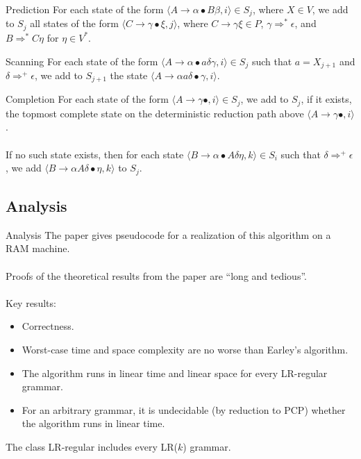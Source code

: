 \documentclass{beamer}
\begin{document}
\begin{frame}{Prediction}
  For each state of the form $\langle A \to \alpha \bullet B \beta, i\rangle \in S_j$, where $X \in V$, we add to $S_j$ all states of the form
  $\langle C \to \gamma\bullet\xi, j\rangle$, where $C \to \gamma\xi \in P$, $\gamma \Rightarrow^* \epsilon$, and $B \Rightarrow^* C\eta$ for $\eta\in V^*$.
\end{frame}

\begin{frame}{Scanning}
  For each state of the form $\langle A \to \alpha \bullet a \delta\gamma, i\rangle\in S_j$ such that $a = X_{j+1}$ and $\delta \Rightarrow^+ \epsilon$, we add to $S_{j+1}$
  the state $\langle A \to \alpha a\delta\bullet\gamma, i\rangle$.
\end{frame}

\begin{frame}{Completion}
  For each state of the form $\langle A \to \gamma\bullet, i\rangle\in S_j$, we add to $S_j$, if it exists, the topmost complete state on the deterministic reduction path above
  $\langle A \to \gamma\bullet, i\rangle$.\\~\\

  If no such state exists, then for each state $\langle B \to \alpha \bullet A \delta\eta, k\rangle\in S_i$ such that $\delta \Rightarrow^+ \epsilon$, we add
  $\langle B \to \alpha A \delta\bullet\eta, k\rangle$ to $S_j$.
\end{frame}

\subsection{Analysis}
\begin{frame}{Analysis}
  The paper gives pseudocode for a realization of this algorithm on a RAM machine.\\~\\

  Proofs of the theoretical results from the paper are ``long and tedious''.\\~\\

  Key results:
  \begin{itemize}
    \item Correctness.
    \item Worst-case time and space complexity are no worse than Earley's algorithm.
    \item The algorithm runs in linear time and linear space for every LR-regular grammar.
    \item For an arbitrary grammar, it is undecidable (by reduction to PCP) whether the algorithm runs in linear time.
  \end{itemize}

  The class LR-regular includes every LR($k$) grammar.
\end{frame}
\end{document}
